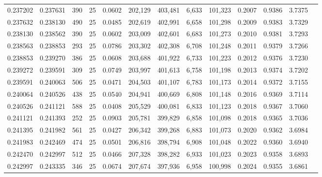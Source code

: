 \begin{tabular}{rrrrrrrrrrrrr}
0.237202 & 0.237631 &   390 &  25 &                                     0.0602 & 202,129 & 403,481 &   6,633 & 101,323 & 0.2007 & 0.9386 & 3.7375 \\
0.237632 & 0.238130 &   490 &  25 &                                     0.0485 & 202,619 & 402,991 &   6,658 & 101,298 & 0.2009 & 0.9383 & 3.7329 \\
0.238130 & 0.238562 &   390 &  25 &                                     0.0602 & 203,009 & 402,601 &   6,683 & 101,273 & 0.2010 & 0.9381 & 3.7293 \\
0.238563 & 0.238853 &   293 &  25 &                                     0.0786 & 203,302 & 402,308 &   6,708 & 101,248 & 0.2011 & 0.9379 & 3.7266 \\
0.238853 & 0.239270 &   386 &  25 &                                     0.0608 & 203,688 & 401,922 &   6,733 & 101,223 & 0.2012 & 0.9376 & 3.7230 \\
0.239272 & 0.239591 &   309 &  25 &                                     0.0749 & 203,997 & 401,613 &   6,758 & 101,198 & 0.2013 & 0.9374 & 3.7202 \\
0.239591 & 0.240063 &   506 &  25 &                                     0.0471 & 204,503 & 401,107 &   6,783 & 101,173 & 0.2014 & 0.9372 & 3.7155 \\
0.240064 & 0.240526 &   438 &  25 &                                     0.0540 & 204,941 & 400,669 &   6,808 & 101,148 & 0.2016 & 0.9369 & 3.7114 \\
0.240526 & 0.241121 &   588 &  25 &                                     0.0408 & 205,529 & 400,081 &   6,833 & 101,123 & 0.2018 & 0.9367 & 3.7060 \\
0.241121 & 0.241393 &   252 &  25 &                                     0.0903 & 205,781 & 399,829 &   6,858 & 101,098 & 0.2018 & 0.9365 & 3.7036 \\
0.241395 & 0.241982 &   561 &  25 &                                     0.0427 & 206,342 & 399,268 &   6,883 & 101,073 & 0.2020 & 0.9362 & 3.6984 \\
0.241983 & 0.242469 &   474 &  25 &                                     0.0501 & 206,816 & 398,794 &   6,908 & 101,048 & 0.2022 & 0.9360 & 3.6940 \\
0.242470 & 0.242997 &   512 &  25 &                                     0.0466 & 207,328 & 398,282 &   6,933 & 101,023 & 0.2023 & 0.9358 & 3.6893 \\
0.242997 & 0.243335 &   346 &  25 &                                     0.0674 & 207,674 & 397,936 &   6,958 & 100,998 & 0.2024 & 0.9355 & 3.6861 \\

\end{tabular}
